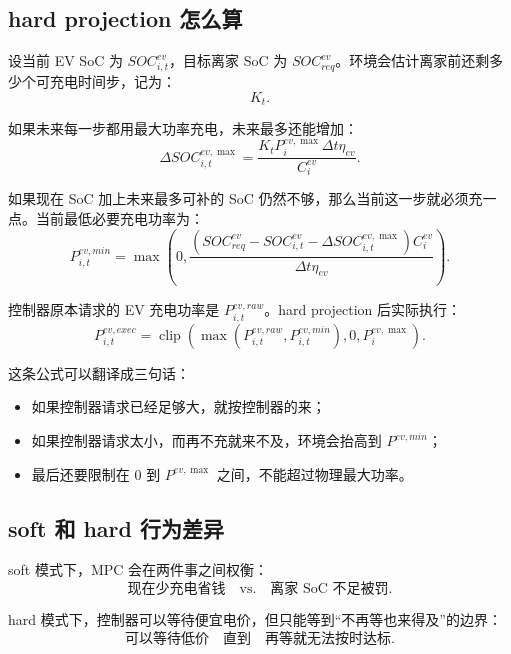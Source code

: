 \documentclass[UTF8,zihao=-4]{ctexart}
\begin{document}
\subsection{hard projection 怎么算}

设当前 EV SoC 为 $SOC^{ev}_{i,t}$，目标离家 SoC 为 $SOC^{ev}_{req}$。环境会估计离家前还剩多少个可充电时间步，记为：
\begin{equation}
K_t.
\end{equation}

如果未来每一步都用最大功率充电，未来最多还能增加：
\begin{equation}
\Delta SOC^{ev,\max}_{i,t}
=
\frac{K_tP^{ev,\max}_i\Delta t\eta_{ev}}{C^{ev}_i}.
\end{equation}

如果现在 SoC 加上未来最多可补的 SoC 仍然不够，那么当前这一步就必须充一点。当前最低必要充电功率为：
\begin{equation}
P^{ev,min}_{i,t}
=
\max\left(
0,
\frac{
\left(
SOC^{ev}_{req}
-SOC^{ev}_{i,t}
-\Delta SOC^{ev,\max}_{i,t}
\right)C^{ev}_i
}
{\Delta t\eta_{ev}}
\right).
\end{equation}

控制器原本请求的 EV 充电功率是 $P^{ev,raw}_{i,t}$。hard projection 后实际执行：
\begin{equation}
P^{ev,exec}_{i,t}
=
\operatorname{clip}
\left(
\max(P^{ev,raw}_{i,t},P^{ev,min}_{i,t}),
0,
P^{ev,\max}_i
\right).
\end{equation}

这条公式可以翻译成三句话：
\begin{itemize}
  \item 如果控制器请求已经足够大，就按控制器的来；
  \item 如果控制器请求太小，而再不充就来不及，环境会抬高到 $P^{ev,min}$；
  \item 最后还要限制在 $0$ 到 $P^{ev,\max}$ 之间，不能超过物理最大功率。
\end{itemize}

\subsection{soft 和 hard 行为差异}

soft 模式下，MPC 会在两件事之间权衡：
\begin{equation}
\text{现在少充电省钱}
\quad \text{vs.}\quad
\text{离家 SoC 不足被罚}.
\end{equation}

hard 模式下，控制器可以等待便宜电价，但只能等到“不再等也来得及”的边界：
\begin{equation}
\text{可以等待低价}
\quad \text{直到}\quad
\text{再等就无法按时达标}.
\end{equation}
\end{document}
